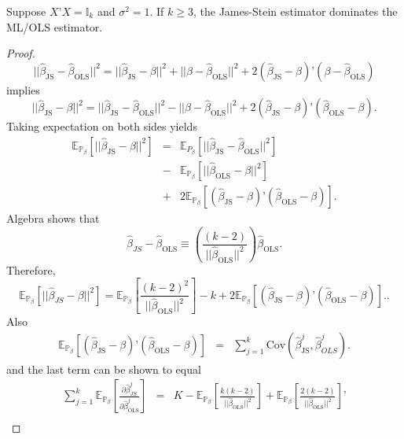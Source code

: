\documentclass[11pt]{article} %
\begin{document}
\begin{proposition}
Suppose $X’X = \mathbb{I}_{k}$ and $\sigma^2=1$. If $k \geq 3$, the James-Stein estimator dominates the ML/OLS estimator. 
\end{proposition}
\begin{proof}
\[ || \widehat{\beta}_{\textrm{JS}} - \widehat{\beta}_{\textrm{OLS}} ||^2  = || \widehat{\beta}_{\textrm{JS}} - \beta ||^2 + || \beta -\widehat{\beta}_{\textrm{OLS}} ||^2 + 2 ( \widehat{\beta}_{\textrm{JS}} - \beta  )’ (\beta -\widehat{\beta}_{\textrm{OLS}}) \]
implies
\[|| \widehat{\beta}_{\textrm{JS}} - \beta ||^2 = || \widehat{\beta}_{\textrm{JS}} - \widehat{\beta}_{\textrm{OLS}} ||^2 - || \beta -\widehat{\beta}_{\textrm{OLS}} ||^2 + 2 ( \widehat{\beta}_{\textrm{JS}} - \beta  )’ (\widehat{\beta}_{\textrm{OLS}}- \beta). \]
Taking expectation on both sides yields
\begin{eqnarray*} 
\mathbb{E}_{\mathbb{P}_{\beta}} \left[ || \widehat{\beta}_{\textrm{JS}} - \beta ||^2 \right] & = & \mathbb{E}_{P_{\beta}} \left[  || \widehat{\beta}_{\textrm{JS}} - \widehat{\beta}_{\textrm{OLS}}||^2 \right] \\
&-& \mathbb{E}_{\mathbb{P}_{\beta}} \left[ || \widehat{\beta}_{\textrm{OLS}}- \beta ||^2 \right] \\
&+& 2 \mathbb{E}_{\mathbb{P}_{\beta}} \left[ (\widehat{\beta}_{\textrm{JS}} -\beta)’( \widehat{\beta}_{\textrm{OLS}}- \beta)  \right].
\end{eqnarray*}
Algebra shows that 
\[\widehat{\beta}_{JS} - \widehat{\beta}_{\textrm{OLS}} \equiv \left(  \frac{(k-2)}{||\widehat{\beta}_{\textrm{OLS}} ||^2} \right) \widehat{\beta}_{\textrm{OLS}}. \]
Therefore,
\[  \mathbb{E}_{\mathbb{P}_{\beta}} \left[ ||\widehat{\beta}_{JS} -\beta ||^2 \right] =  \mathbb{E}_{\mathbb{P}_{\beta}}  \left[ \frac{(k-2)^2}{|| \widehat{\beta}_{\textrm{OLS}} ||^2} \right] - k + 2 \mathbb{E}_{\mathbb{P}_{\beta}} \left[ (\widehat{\beta}_{\textrm{JS}} -\beta)’( \widehat{\beta}_{\textrm{OLS}}- \beta)  \right]. . \]
Also
\begin{eqnarray*}
\mathbb{E}_{\mathbb{P}_{\beta}} \left[ (\widehat{\beta}_{\textrm{JS}} - \beta)’( \widehat{\beta}_{\textrm{OLS}}- \beta)  \right] &=& \sum_{j=1}^{k} \textrm{Cov}( \widehat{\beta}^j_{\textrm{JS}},\widehat{\beta}^j_{OLS} ). 
\end{eqnarray*}
and the last term can be shown to equal
\begin{eqnarray*}
\sum_{j=1}^{k} \mathbb{E}_{\mathbb{P}_{\beta}} \left[ \frac{\partial \widehat{\beta}^j_{JS} }{\partial \widehat{\beta}^j_{\textrm{OLS}}} \right] &=& K - \mathbb{E}_{\mathbb{P}_{\beta}} \left[ \frac{k  (k-2)}{||\widehat{\beta}_{\textrm{OLS}} ||^2} \right] + \mathbb{E}_{\mathbb{P}_{\beta}} \left[ \frac{2(k-2)}{||\widehat{\beta}_{\textrm{OLS}} ||^2} \right]’ \\

\end{eqnarray*}
\end{proof}
\end{document}
